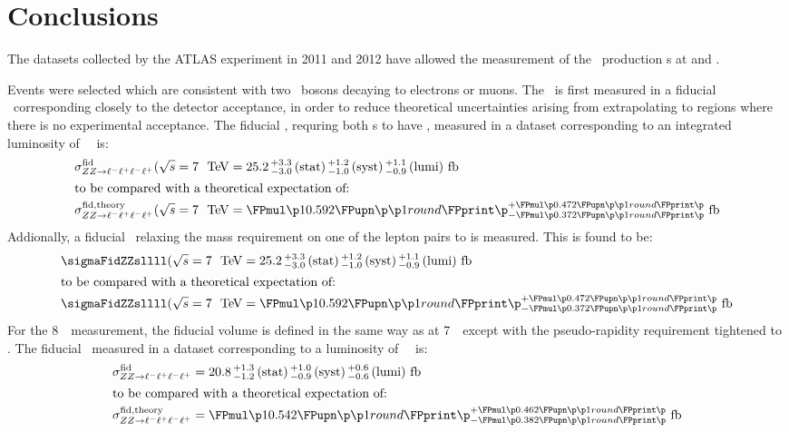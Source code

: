 \graphicspath{{Chapters/Conclusions/Figures/}}
\chapter{Conclusions}
\label{chap:Conclusions}
The datasets collected by the ATLAS experiment in 2011 and 2012 have allowed the
measurement of the \ZZ\ production \cx s at  and .

Events were selected which are consistent with two \Z\ bosons decaying to electrons or muons. The \cx\ is
first measured in a fiducial \phasespace\ corresponding closely to the detector
acceptance, in order to reduce theoretical uncertainties arising from
extrapolating to regions where there is no experimental acceptance.
The fiducial \cx,  requring both \leppair s to have \sstooos, measured in a
dataset corresponding to an integrated  luminosity of
\LumiPassGRLTwentyEleven~\ifb\ is:
\begin{align}
\sigmaFidZZllll(\sqrtseq{7} &= \ZZSevenTeVFiducialCrossSectionZZLLLL \\
\intertext{to be compared with a theoretical expectation of:}
\sigmaFidTheoryZZllll(\sqrtseq{7} &= \ZZSevenTeVTheoryFiducialCrossSectionZZLLLL
\end{align}
Addionally, a fiducial \cx\ relaxing the mass requirement on one of the lepton pairs
to \mllgtt is measured. This is found to be:
\begin{align}
\sigmaFidZZsllll(\sqrtseq{7} &= \ZZSevenTeVFiducialCrossSectionZZLLLL \\
\intertext{to be compared with a theoretical expectation of:}
\sigmaFidZZsllll(\sqrtseq{7} &= \ZZSevenTeVTheoryFiducialCrossSectionZZLLLL
\end{align}
For the 8~\tev\ measurement, the fiducial volume is defined in the same way as
at 7~\tev\, except with the pseudo-rapidity requirement tightened to . The fiducial \cx\
measured in a dataset corresponding to a luminosity of
\LumiPassGRLTwentyTwelve~\ifb\ is:
\begin{align}
\sigmaFidZZllll &= \ZZEightTeVFiducialCrossSectionZZLLLL \\
\intertext{to be compared with a theoretical expectation of:}
\sigmaFidTheoryZZllll &= \ZZEightTeVTheoryFiducialCrossSectionZZLLLL
\end{align}

